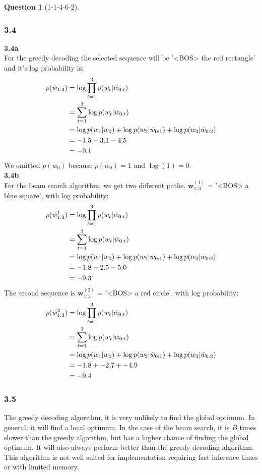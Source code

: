 \documentclass[12pt]{article}
\theoremstyle{definition}
\newtheorem{exercise}{Question}%
\begin{document}
\begin{exercise}[1-1-4-6-2]
{    \subsubsection*{3.4}
    \textbf{3.4a}
    \\
    For the greedy decoding the selected sequence will be '<BOS> the red rectangle' and it's
    log probability is:
    \begin{align*}
      p(\bar{w}_{1:3}) &= \log \prod_{t=1}^{3} p(w_{t}| \boldmath{\bar{w}}_{0:t}) \\
      &=\sum_{t=1}^{3} \log p(w_{t}| \boldmath{\bar{w}}_{0:t}) \\
      &= \log p(w_{1}| w_{0})+\log p(w_{2}| \bar{w}_{0:1})+\log p(w_{3}| \bar{ w }_{0:2})\\
      &= -1.5 -3.1 -4.5 \\
      &= -9.1
    \end{align*}We omitted $p(w_{0})$ because $p(w_{0})=1$ and $\log (1)=0$.
    \\
    \textbf{3.4b}
    \\
    For the beam search algorithm, we get two different paths.
    $\mathbf{w}_{1:3}^{(1)}$ = '<BOS> a blue square', with log probability:
    \begin{align*}
      p(\bar{w}_{1:3}^{1}) &= \log \prod_{t=1}^{3} p(w_{t}| \boldmath{\bar{w}}_{0:t}) \\
      &=\sum_{t=1}^{3} \log p(w_{t}| \boldmath{\bar{w}}_{0:t}) \\
      &= \log p(w_{1}| w_{0})+\log p(w_{2}| \bar{w}_{0:1})+\log p(w_{3}| \bar{ w }_{0:2})\\
      &= -1.8 -2.5 -5.0 \\
      &= -9.3
    \end{align*}
    The second sequence is $\mathbf{w}_{1:3}^{(2)}$ = '<BOS> a red circle', with log probability:
    \begin{align*}
      p(\bar{w}_{1:3}^{2}) &= \log \prod_{t=1}^{3} p(w_{t}| \boldmath{\bar{w}}_{0:t}) \\
      &=\sum_{t=1}^{3} \log p(w_{t}| \boldmath{\bar{w}}_{0:t}) \\
      &= \log p(w_{1}| w_{0})+\log p(w_{2}| \bar{w}_{0:1})+\log p(w_{3}| \bar{ w }_{0:2})\\
      &= -1.8 + -2.7 + -4.9\\
      &= -9.4
    \end{align*}
    \subsubsection*{3.5}
    The greedy decoding algorithm, it is very unlikely to find the global
    optimum. In general, it will find a local optimum. In the case of the beam
    search, it is $B$ times slower than the greedy algorithm, but has a higher
    chance of finding the global optimum. It will also always perform better
    than the greedy decoding algorithm. This algorithm is not well suited for
    implementation requiring fast inference times or with limited memory.
    }
\end{exercise}
\end{document}
